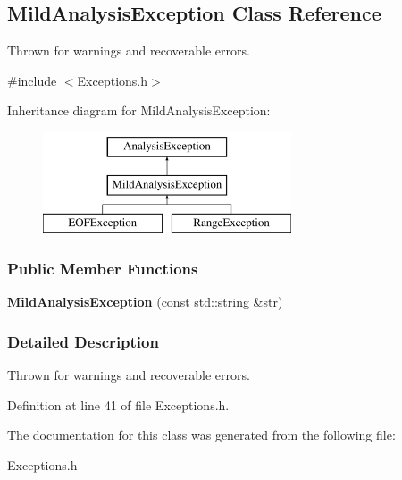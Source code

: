 \hypertarget{classMildAnalysisException}{
\subsection{MildAnalysisException Class Reference}
\label{classMildAnalysisException}
}


Thrown for warnings and recoverable errors.  




{\ttfamily \#include $<$Exceptions.h$>$}

Inheritance diagram for MildAnalysisException:\begin{figure}[H]
\begin{center}
\leavevmode
\includegraphics[height=3.000000cm]{classMildAnalysisException}
\end{center}
\end{figure}
\subsubsection*{Public Member Functions}
\begin{DoxyCompactItemize}
\item 
\hypertarget{classMildAnalysisException_a3e7d6c6178a00933856fac70f136c145}{
{\bfseries MildAnalysisException} (const std::string \&str)}
\label{classMildAnalysisException_a3e7d6c6178a00933856fac70f136c145}

\end{DoxyCompactItemize}


\subsubsection{Detailed Description}
Thrown for warnings and recoverable errors. 

Definition at line 41 of file Exceptions.h.



The documentation for this class was generated from the following file:\begin{DoxyCompactItemize}
\item 
Exceptions.h\end{DoxyCompactItemize}
